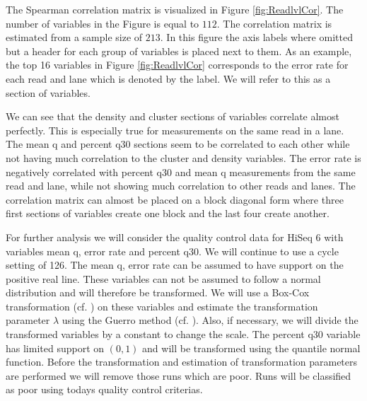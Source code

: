\documentclass[a4paper,11pt,fleqn,twoside,notitlepage]{report}\usepackage[]{graphicx}\usepackage[]{color}
\begin{document}
The Spearman correlation matrix is visualized in Figure \ref{fig:ReadlvlCor}. The number of variables in the Figure is equal to $112$. The correlation matrix is estimated from a sample size of $213$. In this figure the axis labels where omitted but a header for each group of variables is placed next to them. As an example, the top 16 variables in Figure \ref{fig:ReadlvlCor} corresponds to the error rate for each read and lane which is denoted by the label. We will refer to this as a section of variables. 

We can see that the density and cluster sections of variables correlate almost perfectly. This is especially true for measurements on the same read in a lane. The mean q and percent q30 sections seem to be correlated to each other while not having much correlation to the cluster and density variables. The error rate is negatively correlated with percent q30 and mean q measurements from the same read and lane, while not showing much correlation to other reads and lanes. The correlation matrix can almost be placed on a block diagonal form where three first sections of variables create one block and the last four create another. %

For further analysis we will consider the quality control data for HiSeq 6 with variables mean q, error rate and percent q30. We will continue to use a cycle setting of 126. The mean q, error rate can be assumed to have support on the positive real line. These variables can not be assumed to follow a normal distribution and will therefore be transformed. We will use a Box-Cox transformation (cf. \citet{BoxCox}) on these variables and estimate the transformation parameter $\lambda$ using the Guerro method (cf. \citet{Gurrero}). Also, if necessary, we will divide the transformed variables by a constant to change the scale. The percent q30 variable has limited support on $(0,1)$ and will be transformed using the quantile normal function. Before the transformation and estimation of transformation parameters are performed we will remove those runs which are poor. Runs will be classified as poor using todays quality control criterias. 
\end{document}
